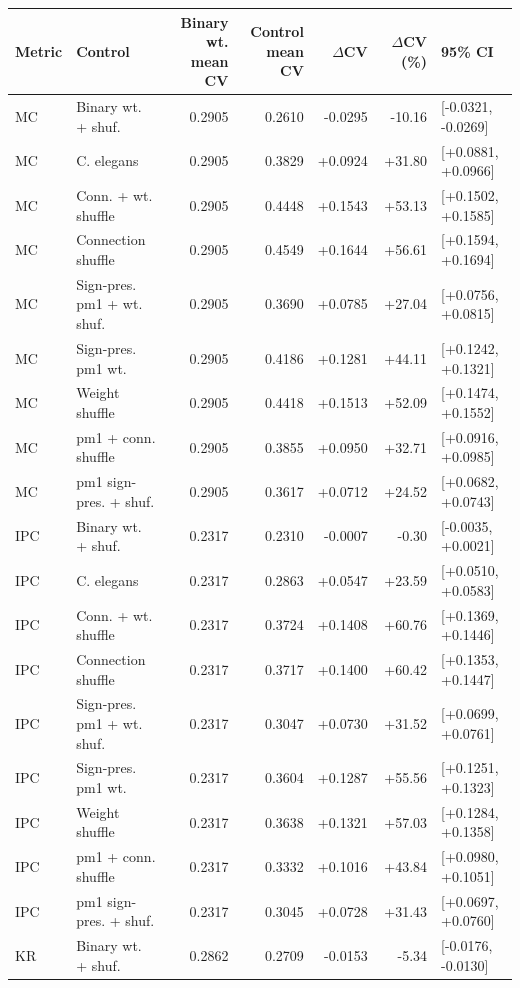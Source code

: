 \begin{tabular}{llrrrrl}
\toprule
Metric & Control & Binary wt. mean CV & Control mean CV & $\Delta$CV & $\Delta$CV (\%) & 95\% CI \\
\midrule
MC & Binary wt. + shuf. & 0.2905 & 0.2610 & -0.0295 & -10.16 & [-0.0321, -0.0269] \\
MC & C. elegans & 0.2905 & 0.3829 & +0.0924 & +31.80 & [+0.0881, +0.0966] \\
MC & Conn. + wt. shuffle & 0.2905 & 0.4448 & +0.1543 & +53.13 & [+0.1502, +0.1585] \\
MC & Connection shuffle & 0.2905 & 0.4549 & +0.1644 & +56.61 & [+0.1594, +0.1694] \\
MC & Sign-pres. pm1 + wt. shuf. & 0.2905 & 0.3690 & +0.0785 & +27.04 & [+0.0756, +0.0815] \\
MC & Sign-pres. pm1 wt. & 0.2905 & 0.4186 & +0.1281 & +44.11 & [+0.1242, +0.1321] \\
MC & Weight shuffle & 0.2905 & 0.4418 & +0.1513 & +52.09 & [+0.1474, +0.1552] \\
MC & pm1 + conn. shuffle & 0.2905 & 0.3855 & +0.0950 & +32.71 & [+0.0916, +0.0985] \\
MC & pm1 sign-pres. + shuf. & 0.2905 & 0.3617 & +0.0712 & +24.52 & [+0.0682, +0.0743] \\
IPC & Binary wt. + shuf. & 0.2317 & 0.2310 & -0.0007 & -0.30 & [-0.0035, +0.0021] \\
IPC & C. elegans & 0.2317 & 0.2863 & +0.0547 & +23.59 & [+0.0510, +0.0583] \\
IPC & Conn. + wt. shuffle & 0.2317 & 0.3724 & +0.1408 & +60.76 & [+0.1369, +0.1446] \\
IPC & Connection shuffle & 0.2317 & 0.3717 & +0.1400 & +60.42 & [+0.1353, +0.1447] \\
IPC & Sign-pres. pm1 + wt. shuf. & 0.2317 & 0.3047 & +0.0730 & +31.52 & [+0.0699, +0.0761] \\
IPC & Sign-pres. pm1 wt. & 0.2317 & 0.3604 & +0.1287 & +55.56 & [+0.1251, +0.1323] \\
IPC & Weight shuffle & 0.2317 & 0.3638 & +0.1321 & +57.03 & [+0.1284, +0.1358] \\
IPC & pm1 + conn. shuffle & 0.2317 & 0.3332 & +0.1016 & +43.84 & [+0.0980, +0.1051] \\
IPC & pm1 sign-pres. + shuf. & 0.2317 & 0.3045 & +0.0728 & +31.43 & [+0.0697, +0.0760] \\
KR & Binary wt. + shuf. & 0.2862 & 0.2709 & -0.0153 & -5.34 & [-0.0176, -0.0130] \\

\end{tabular}
